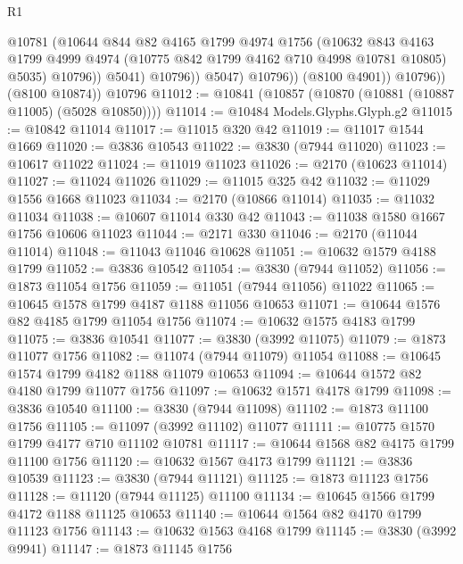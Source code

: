 \begin{lexlean}{R1}
\begin{coremodule}
                          @10781
                          (@10644
                            @844
                            @82
                            @4165
                            @1799
                            @4974
                            @1756
                            (@10632
                              @843
                              @4163
                              @1799
                              @4999
                              @4974
                              (@10775 @842 @1799 @4162 @710 @4998 @10781 @10805)
                              @5035)
                            @10796))
                        @5041)
                      @10796))
                  @5047)
                @10796))
            (@8100 @4901))
          @10796))
      (@8100 @10874))
    @10796
@11012 := @10841 (@10857 (@10870 (@10881 (@10887 @11005) (@5028 @10850))))
@11014 := @10484 Models.Glyphs.Glyph.g2
@11015 := @10842 @11014
@11017 := @11015 @320 @42
@11019 := @11017 @1544 @1669
@11020 := @3836 @10543
@11022 := @3830 (@7944 @11020)
@11023 := @10617 @11022
@11024 := @11019 @11023
@11026 := @2170 (@10623 @11014)
@11027 := @11024 @11026
@11029 := @11015 @325 @42
@11032 := @11029 @1556 @1668 @11023
@11034 := @2170 (@10866 @11014)
@11035 := @11032 @11034
@11038 := @10607 @11014 @330 @42
@11043 := @11038 @1580 @1667 @1756 @10606 @11023
@11044 := @2171 @330
@11046 := @2170 (@11044 @11014)
@11048 := @11043 @11046 @10628
@11051 := @10632 @1579 @4188 @1799
@11052 := @3836 @10542
@11054 := @3830 (@7944 @11052)
@11056 := @1873 @11054 @1756
@11059 := @11051 (@7944 @11056) @11022
@11065 := @10645 @1578 @1799 @4187 @1188 @11056 @10653
@11071 := @10644 @1576 @82 @4185 @1799 @11054 @1756
@11074 := @10632 @1575 @4183 @1799
@11075 := @3836 @10541
@11077 := @3830 (@3992 @11075)
@11079 := @1873 @11077 @1756
@11082 := @11074 (@7944 @11079) @11054
@11088 := @10645 @1574 @1799 @4182 @1188 @11079 @10653
@11094 := @10644 @1572 @82 @4180 @1799 @11077 @1756
@11097 := @10632 @1571 @4178 @1799
@11098 := @3836 @10540
@11100 := @3830 (@7944 @11098)
@11102 := @1873 @11100 @1756
@11105 := @11097 (@3992 @11102) @11077
@11111 := @10775 @1570 @1799 @4177 @710 @11102 @10781
@11117 := @10644 @1568 @82 @4175 @1799 @11100 @1756
@11120 := @10632 @1567 @4173 @1799
@11121 := @3836 @10539
@11123 := @3830 (@7944 @11121)
@11125 := @1873 @11123 @1756
@11128 := @11120 (@7944 @11125) @11100
@11134 := @10645 @1566 @1799 @4172 @1188 @11125 @10653
@11140 := @10644 @1564 @82 @4170 @1799 @11123 @1756
@11143 := @10632 @1563 @4168 @1799
@11145 := @3830 (@3992 @9941)
@11147 := @1873 @11145 @1756

\end{coremodule}
\end{lexlean}
